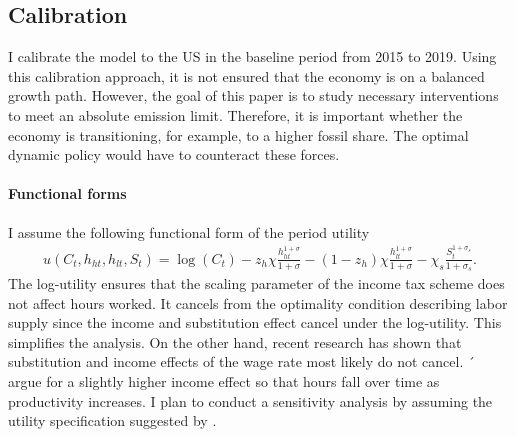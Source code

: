 \subsection{Calibration}\label{sec:calib}


 I calibrate the model to the US in the baseline period from 2015 to 2019. Using this calibration approach, it is not ensured that the economy is on a balanced growth path. However, the goal of this paper is to study necessary interventions to meet an absolute emission limit. Therefore, %
 it is important whether the economy is transitioning, for example, to %
 a higher fossil share. The optimal dynamic policy would have to counteract these forces. %




\paragraph{Functional forms} I assume the following functional form of the period utility
\begin{align}
u(C_t,h_{ht}, h_{lt}, S_t )= \log(C_t)-z_h\chi\frac{h_{ht}^{1+\sigma}}{{1+\sigma}}-(1-z_h)\chi\frac{h_{lt}^{1+\sigma}}{{1+\sigma}}-\chi_s\frac{S_t^{1+\sigma_s}}{1+\sigma_s}.
\end{align}
The log-utility ensures that the scaling parameter of the income tax scheme does not affect hours worked. It cancels from the optimality condition describing labor supply since the income and substitution effect cancel under the log-utility. 
This simplifies the analysis. On the other hand, recent research has shown that substitution and income effects of the wage rate most likely do not cancel. ´\cite{Boppart2019LaborPerspectiveb} argue for a slightly higher income effect so that hours fall over time as productivity increases. I plan to conduct a sensitivity analysis by assuming the utility specification suggested by \cite{Boppart2019LaborPerspectiveb}. 

